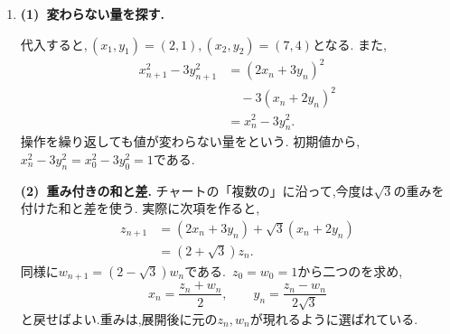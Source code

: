 \begin{enumerate}[label=\textbf{問\arabic*.},leftmargin=3.8em,format=\bookitemlink{practice-bridge}{solution}{problem}]
                \smallskip
                \textbf{(3)~不等式を足す.}
                $\displaystyle b_1=1$である.\,$\displaystyle n\ge2$では,(2)を$\displaystyle k=1,\ldots,n-1$について足すと,
                \[
                  \frac{n-1}{2}\le b_n-1\le n-1.
                \]
                よって,\,$\displaystyle \frac{n+1}{2}\le b_n\le n$である.この式は$\displaystyle n=1$でも成り立つ.
                すべて正なので,逆数を取ると不等号の向きが変わり,
                \[
                  \frac1n\le a_n\le\frac2{n+1}.
                \]
                両端が$\displaystyle 0$に近づくから,はさみうちの原理で$\displaystyle a_n\to0$を得る.
                本編の逆数化との考え方を,の計算から不等式の評価へ広げている.
          \item \textbf{(1)~変わらない量を探す.}\par\nobreak
                代入すると,\,$\displaystyle (x_1,y_1)=(2,1),(x_2,y_2)=(7,4)$となる.
                また,
                \begin{align*}
                  x_{n+1}^2-3y_{n+1}^2
                    &=(2x_n+3y_n)^2\\
                    &\quad-3(x_n+2y_n)^2\\
                    &=x_n^2-3y_n^2.
                \end{align*}
                操作を繰り返しても値が変わらない量を\textbf{}という.
                初期値から,\,$\displaystyle x_n^2-3y_n^2=x_0^2-3y_0^2=1$である.

                \smallskip
                \textbf{(2)~重み付きの和と差.}
                チャートの「複数の」に沿って,今度は$\displaystyle \sqrt3$の重みを付けた和と差を使う.
                実際に次項を作ると,
                \begin{align*}
                  z_{n+1}
                    &=(2x_n+3y_n)+\sqrt3(x_n+2y_n)\\
                    &=(2+\sqrt3)z_n.
                \end{align*}
                同様に$\displaystyle w_{n+1}=(2-\sqrt3)w_n$である.\,
                $\displaystyle z_0=w_0=1$から二つのを求め,
                \[
                  x_n=\frac{z_n+w_n}{2},\qquad
                  y_n=\frac{z_n-w_n}{2\sqrt3}
                \]
                と戻せばよい.重みは,展開後に元の$\displaystyle z_n,w_n$が現れるように選ばれている.


\end{enumerate}
